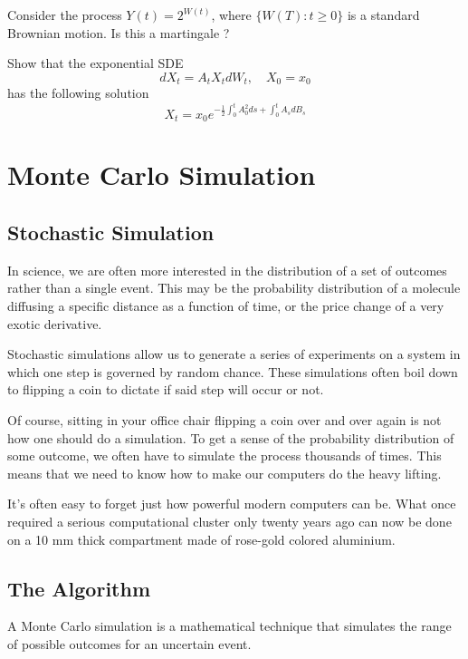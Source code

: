 \documentclass[12pt,a4paper]{book}
\begin{document}
\begin{question}[subtitle=Martingale]
Consider the process $Y(t) = 2^{W(t)}$, where $\{W(T):t\geq 0\}$ is a standard Brownian motion. 
Is this a martingale ?
\end{question}

\begin{question}[subtitle=Stochastic Differential Equation]
Show that the exponential SDE
\begin{equation*}
dX_t = A_t X_tdW_t,\quad X_0=x_0
\end{equation*}
has the following solution
\begin{equation*}
X_t = x_0 e^{-\frac{1}{2}\int_0^t A_0^2 ds+\int_0^t A_s dB_s}
\end{equation*}
\end{question}

\chapter{Monte Carlo Simulation}

\section{Stochastic Simulation}
In science, we are often more interested in the distribution of a set of outcomes rather than a single event. This may be the probability distribution of a molecule diffusing a specific distance as a function of time, or the price change of a very exotic derivative.

Stochastic simulations allow us to generate a series of experiments on a system in which one step is governed by random chance. These simulations often boil down to flipping a coin to dictate if said step will occur or not.

Of course, sitting in your office chair flipping a coin over and over again is not how one should do a simulation. To get a sense of the probability distribution of some outcome, we often have to simulate the process thousands of times. This means that we need to know how to make our computers do the heavy lifting.

It's often easy to forget just how powerful modern computers can be. What once required a serious computational cluster only twenty years ago can now be done on a 10 mm thick compartment made of rose-gold colored aluminium. 

\section{The Algorithm}
A Monte Carlo simulation is a mathematical technique that simulates the range of possible outcomes for an uncertain event.
\end{document}

